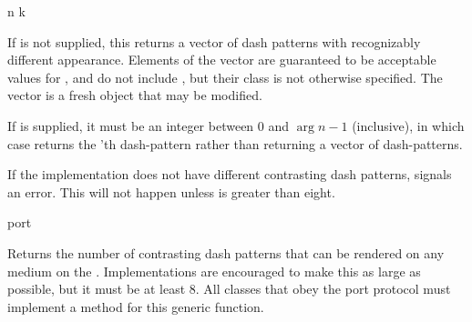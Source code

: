  {n \optional k}

If  is not supplied, this returns a vector of  dash patterns with
recognizably different appearance.  Elements of the vector are guaranteed to be
acceptable values for , and do not include , but their class
is not otherwise specified.  The vector is a fresh object that may be modified.

If  is supplied, it must be an integer between 0 and $\arg{n}-1$
(inclusive), in which case  returns the
'th dash-pattern rather than returning a vector of dash-patterns.

If the implementation does not have  different contrasting dash patterns,
 signals an error.  This will not happen
unless  is greater than eight.

 {port}

Returns the number of contrasting dash patterns that can be rendered on any
medium on the  .  Implementations are encouraged to make
this as large as possible, but it must be at least 8.  All classes that obey the
port protocol must implement a method for this generic function.
